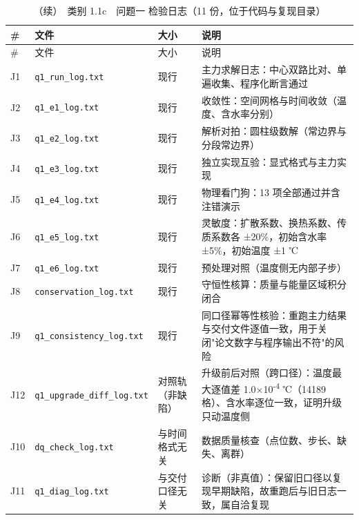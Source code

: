 \begin{longtable}{>{\centering\arraybackslash}m{\dimexpr 0.070\tblw\relax}>{\raggedright\arraybackslash}m{\dimexpr 0.229\tblw\relax}>{\raggedright\arraybackslash}m{\dimexpr 0.175\tblw\relax}>{\raggedright\arraybackslash}m{\dimexpr 0.526\tblw\relax}}
  \caption{（续）　类别 1.1c　问题一 检验日志（11 份，位于代码与复现目录）}\label{tab:A-1-b}\\
  \toprule
    \# & 文件 & 大小 & 说明 \\
  \midrule
  \endfirsthead
  \toprule
    \# & 文件 & 大小 & 说明 \\
  \midrule
  \endhead
  \bottomrule
  \endfoot
  \bottomrule
  \endlastfoot
  J1 & \texttt{q1\_\allowbreak{}run\_\allowbreak{}log.\allowbreak{}txt} & 现行 & 主力求解日志：中心双路比对、单遍收集、程序化断言通过 \\
  J2 & \texttt{q1\_\allowbreak{}e1\_\allowbreak{}log.\allowbreak{}txt} & 现行 & 收敛性：空间网格与时间收敛（温度、含水率分别） \\
  J3 & \texttt{q1\_\allowbreak{}e2\_\allowbreak{}log.\allowbreak{}txt} & 现行 & 解析对拍：圆柱级数解（常边界与分段常边界） \\
  J4 & \texttt{q1\_\allowbreak{}e3\_\allowbreak{}log.\allowbreak{}txt} & 现行 & 独立实现互验：显式格式与主力实现 \\
  J5 & \texttt{q1\_\allowbreak{}e4\_\allowbreak{}log.\allowbreak{}txt} & 现行 & 物理看门狗：13 项全部通过并含注错演示 \\
  J6 & \texttt{q1\_\allowbreak{}e5\_\allowbreak{}log.\allowbreak{}txt} & 现行 & 灵敏度：扩散系数、换热系数、传质系数各 ±20\%，初始含水率 ±5\%，初始温度 ±1 ℃ \\
  J7 & \texttt{q1\_\allowbreak{}e6\_\allowbreak{}log.\allowbreak{}txt} & 现行 & 预处理对照（温度侧无内部子步） \\
  J8 & \texttt{conservation\_\allowbreak{}log.\allowbreak{}txt} & 现行 & 守恒性核算：质量与能量区域积分闭合 \\
  J9 & \texttt{q1\_\allowbreak{}consistency\_\allowbreak{}log.\allowbreak{}txt} & 现行 & 同口径幂等性核验：重跑主力结果与交付文件逐值一致，用于关闭"论文数字与程序输出不符"的风险 \\
  J12 & \texttt{q1\_\allowbreak{}upgrade\_\allowbreak{}diff\_\allowbreak{}log.\allowbreak{}txt} & 对照轨（非缺陷） & 升级前后对照（跨口径）：温度最大逐值差 1.0×10\textsuperscript{-4} ℃（14189 格）、含水率逐位一致，证明升级只动温度侧 \\
  J10 & \texttt{dq\_\allowbreak{}check\_\allowbreak{}log.\allowbreak{}txt} & 与时间格式无关 & 数据质量核查（点位数、步长、缺失、离群） \\
  J11 & \texttt{q1\_\allowbreak{}diag\_\allowbreak{}log.\allowbreak{}txt} & 与交付口径无关 & 诊断（非真值）：保留旧口径以复现早期缺陷，故重跑后与旧日志一致，属自洽复现 \\
\end{longtable}



